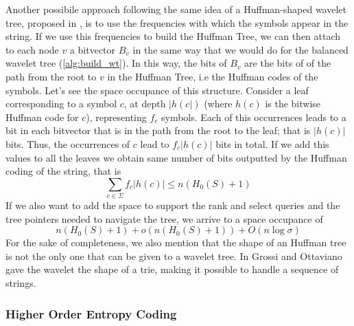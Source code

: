 \noindent Another possibile approach following the same idea of a Huffman-shaped wavelet tree, proposed in \cite{makinen2004new}, is to use the frequencies with which the symbols appear in the string. If we use this frequencies to build the Huffman Tree, we can then attach to each node $v$ a bitvector $B_v$ in the same way that we would do for the balanced wavelet tree (\ref{alg:build_wt}). In this way, the bits of $B_v$ are the bits of of the path from the root to $v$ in the Huffman Tree, i.e the Huffman codes of the symbols. Let's see the space occupance of this structure. Consider a leaf corresponding to a symbol $c$, at depth $|h(c|)$ (where $h(c)$ is the bitwise Huffman code for $c$), representing $f_c$ symbols. Each of this occurrences leads to a bit in each bitvector that is in the path from the root to the leaf; that is $|h(c)|$ bits. Thus, the occurrences of $c$ lead to $f_c |h(c)|$ bits in total. If we add this values to all the leaves we obtain same number of bits outputted by the Huffman coding of the string, that is
\begin{equation}
    \sum_{c \in \Sigma} f_c |h(c)| \leq n(H_0(S) + 1)
\end{equation}
If we also want to add the space to support the rank and select queries and the tree pointers needed to navigate the tree, we arrive to a space occupance of
\begin{equation}
    n(H_0(S) + 1) + o(n(H_0(S) + 1)) + O(n \log \sigma)
\end{equation}
For the sake of completeness, we also mention that the shape of an Huffman tree is not the only one that can be given to a wavelet tree. In \cite{grossi2012wavelet} Grossi and Ottaviano gave the wavelet the shape of a trie, making it possible to handle a sequence of strings.

\subsubsection{Higher Order Entropy Coding}

